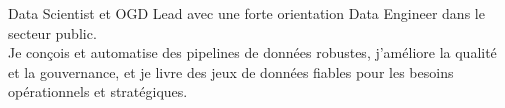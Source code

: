 
\begin{cvparagraph}
\sloppy
Data Scientist et OGD Lead avec une forte orientation Data Engineer dans le secteur public.\\
Je conçois et automatise des pipelines de données robustes, j'améliore la qualité et la gouvernance, et je livre des jeux de données fiables pour les besoins opérationnels et stratégiques.
\end{cvparagraph}

